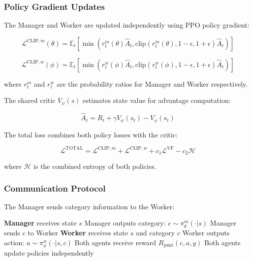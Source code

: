 \documentclass[conference]{IEEEtran}
\begin{document}
\subsubsection{Policy Gradient Updates}

The Manager and Worker are updated independently using PPO policy gradient:

\begin{equation}
\mathcal{L}^{\text{CLIP},m}(\theta) = \mathbb{E}_t \left[ \min\left( r_t^m(\theta) \hat{A}_t, \text{clip}(r_t^m(\theta), 1-\epsilon, 1+\epsilon) \hat{A}_t \right) \right]
\end{equation}

\begin{equation}
\mathcal{L}^{\text{CLIP},w}(\phi) = \mathbb{E}_t \left[ \min\left( r_t^w(\phi) \hat{A}_t, \text{clip}(r_t^w(\phi), 1-\epsilon, 1+\epsilon) \hat{A}_t \right) \right]
\end{equation}

where $r_t^m$ and $r_t^w$ are the probability ratios for Manager and Worker respectively.

The shared critic $V_\psi(s)$ estimates state value for advantage computation:

\begin{equation}
\hat{A}_t = R_t + \gamma V_\psi(s_t) - V_\psi(s_t)
\end{equation}

The total loss combines both policy losses with the critic:

\begin{equation}
\mathcal{L}^{\text{TOTAL}} = \mathcal{L}^{\text{CLIP},m} + \mathcal{L}^{\text{CLIP},w} + c_1 \mathcal{L}^{\text{VF}} - c_2 \mathcal{H}
\end{equation}

where $\mathcal{H}$ is the combined entropy of both policies.

\subsubsection{Communication Protocol}

The Manager sends category information to the Worker:

\begin{algorithm}[htbp]
\caption{Hierarchical Agent Decision Process}
\begin{algorithmic}[1]
\State \textbf{Manager} receives state $s$
\State Manager outputs category: $c \sim \pi_\theta^m(\cdot | s)$
\State Manager sends $c$ to Worker
\State \textbf{Worker} receives state $s$ and category $c$
\State Worker outputs action: $a \sim \pi_\phi^w(\cdot | s, c)$
\State Both agents receive reward $R_{\text{joint}}(c, a, y)$
\State Both agents update policies independently
\end{algorithmic}
\end{algorithm}
\end{document}
